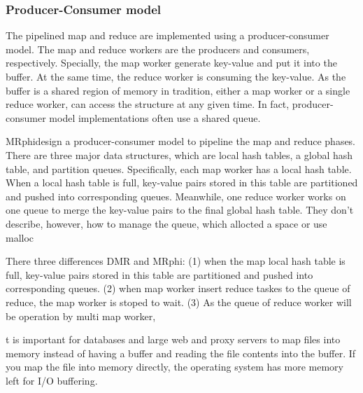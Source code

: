 

\subsubsection{Producer-Consumer model}
The pipelined map and reduce are implemented using a
producer-consumer model. 
The map and reduce workers are the producers and consumers, respectively.
Specially, the map worker generate key-value and 
put it into the buffer.
At the same time, 
the reduce worker is consuming the key-value.
As the buffer is a shared region of memory in tradition,
either a map worker or a single reduce worker,
can access the structure at any given time.
In fact, producer-consumer model implementations
often use a shared queue.

MRphi\cite{lu2013mrphi}design a producer-consumer model 
to pipeline the map and reduce phases. 
There are three major data structures, 
which are local hash tables, a global hash table, 
and partition queues. 
Specifically, each map worker has a local hash table. 
When a local hash table is full,
key-value pairs stored in this table are partitioned and
pushed into corresponding queues. 
Meanwhile, one reduce
worker works on one queue to merge the key-value pairs to
the final global hash table.
{\color{red}They don’t describe, however, how to manage the queue,
which allocted a space or use malloc}


There three differences DMR and MRphi:
(1) when the map local hash table is full,
key-value pairs stored in this table are partitioned and
pushed into corresponding queues.
(2) when map worker insert reduce taskes to the queue of reduce,
the map worker is stoped to wait.
(3)%
As the queue of reduce worker will be operation by multi map worker,

t is important for databases and large web and proxy servers to map files into memory instead of having a buffer and reading the file contents into the buffer. If you map the file into memory directly, the operating system has more memory left for I/O buffering.


